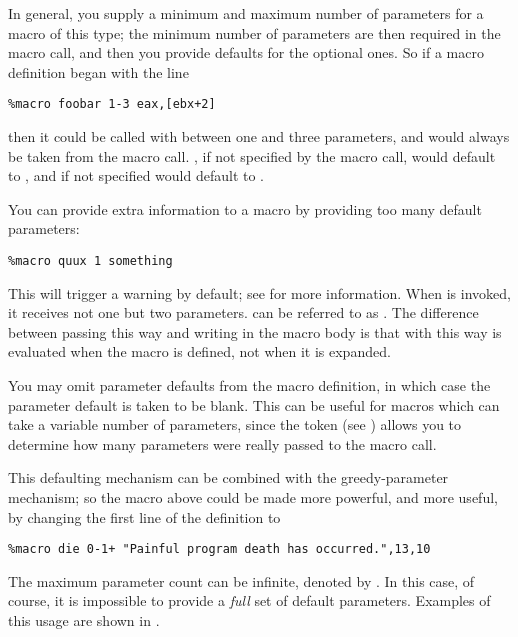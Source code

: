 In general, you supply a minimum and maximum number of parameters
for a macro of this type; the minimum number of parameters are then
required in the macro call, and then you provide defaults for the
optional ones. So if a macro definition began with the line

\begin{lstlisting}
%macro foobar 1-3 eax,[ebx+2]
\end{lstlisting}

then it could be called with between one and three parameters, and
 would always be taken from the macro call. , if not
specified by the macro call, would default to , and 
if not specified would default to \code{[ebx+2]}.

You can provide extra information to a macro by providing
too many default parameters:

\begin{lstlisting}
%macro quux 1 something
\end{lstlisting}

This will trigger a warning by default; see  for
more information.
When  is invoked, it receives not one but two parameters.
 can be referred to as . The difference
between passing  this way and writing 
in the macro body is that with this way  is evaluated
when the macro is defined, not when it is expanded.

You may omit parameter defaults from the macro definition, in which
case the parameter default is taken to be blank. This can be useful
for macros which can take a variable number of parameters, since the
 token (see ) allows you to
determine how many parameters were really passed to the macro call.

This defaulting mechanism can be combined with the greedy-parameter
mechanism; so the  macro above could be made more powerful,
and more useful, by changing the first line of the definition to

\begin{lstlisting}
%macro die 0-1+ "Painful program death has occurred.",13,10
\end{lstlisting}

The maximum parameter count can be infinite, denoted by \code{*}. In
this case, of course, it is impossible to provide a \emph{full} set of
default parameters. Examples of this usage are shown in
.

